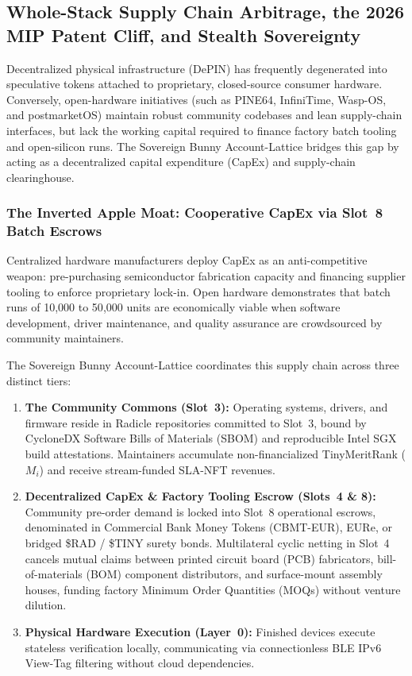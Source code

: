 \documentclass[a4paper,11pt,twoside,parskip=half-,headings=small]{scrartcl}
\begin{document}
\subsection{Whole-Stack Supply Chain Arbitrage, the 2026 MIP Patent Cliff, and Stealth Sovereignty}
\label{sec:stealth_sovereignty}

Decentralized physical infrastructure (DePIN) has frequently degenerated into speculative tokens attached to proprietary, closed-source consumer hardware. Conversely, open-hardware initiatives (such as PINE64, InfiniTime, Wasp-OS, and postmarketOS) maintain robust community codebases and lean supply-chain interfaces, but lack the working capital required to finance factory batch tooling and open-silicon runs. The Sovereign Bunny Account-Lattice bridges this gap by acting as a decentralized capital expenditure (CapEx) and supply-chain clearinghouse.

\subsubsection{The Inverted Apple Moat: Cooperative CapEx via Slot~8 Batch Escrows}
Centralized hardware manufacturers deploy CapEx as an anti-competitive weapon: pre-purchasing semiconductor fabrication capacity and financing supplier tooling to enforce proprietary lock-in. Open hardware demonstrates that batch runs of 10{,}000 to 50{,}000 units are economically viable when software development, driver maintenance, and quality assurance are crowdsourced by community maintainers.

The Sovereign Bunny Account-Lattice coordinates this supply chain across three distinct tiers:
\begin{enumerate}
  \item \textbf{The Community Commons (Slot~3):} Operating systems, drivers, and firmware reside in Radicle repositories committed to Slot~3, bound by CycloneDX Software Bills of Materials (SBOM) and reproducible Intel SGX build attestations. Maintainers accumulate non-financialized TinyMeritRank ($M_i$) and receive stream-funded SLA-NFT revenues.
  \item \textbf{Decentralized CapEx \& Factory Tooling Escrow (Slots~4 \& 8):} Community pre-order demand is locked into Slot~8 operational escrows, denominated in Commercial Bank Money Tokens (CBMT-EUR), EURe, or bridged \$RAD / \$TINY surety bonds. Multilateral cyclic netting in Slot~4 cancels mutual claims between printed circuit board (PCB) fabricators, bill-of-materials (BOM) component distributors, and surface-mount assembly houses, funding factory Minimum Order Quantities (MOQs) without venture dilution.
  \item \textbf{Physical Hardware Execution (Layer~0):} Finished devices execute stateless verification locally, communicating via connectionless BLE IPv6 View-Tag filtering without cloud dependencies.
\end{enumerate}
\end{document}
